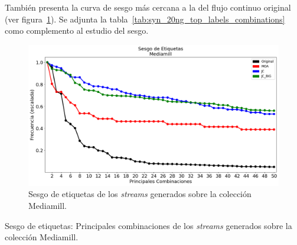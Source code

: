 También presenta la curva de sesgo más cercana a la del flujo continuo original
(ver figura~\ref{fig:syn_mediamill_label_skew}). Se adjunta la
tabla~\ref{tab:syn_20ng_top_labels_combinations} como complemento al estudio del
sesgo.

\bigskip
\begin{figure}[htbp]
	\includegraphics[width=\linewidth]{figures/experiments/syn/mediamill/label_skew.png}
	\caption{Sesgo de etiquetas de los \textit{streams} generados sobre la
		colección Mediamill.}
	\label{fig:syn_mediamill_label_skew}
\end{figure}

\bigskip
\begin{table}[htbp]
	\centering
	\begin{adjustbox}{max width=\textwidth}
		
	\end{adjustbox}
	\caption{Sesgo de etiquetas: Principales combinaciones de los
		\textit{streams} generados sobre la colección Mediamill.}
	\label{tab:syn_mediamill_top_labels_combinations}
\end{table}
\bigskip

